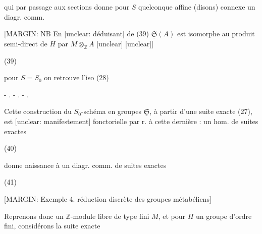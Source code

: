 qui par passage aux sections donne
pour $S$ quelconque affine (disons) connexe
un diagr. comm.

[MARGIN: NB En [unclear: déduisant] de (39)
$\underline{\mathfrak{S}}(A)$ est isomorphe
au produit semi-direct
de $H$ par
$M \otimes_{\mathbb{Z}} A$
[unclear]
[unclear]]

(39)

pour $S=S_0$ on retrouve l'iso (28)

- . - . - .

Cette construction du $S_0$-schéma en
groupes $\underline{\mathfrak{S}}$, à partir d'une
suite exacte (27), est [unclear: manifestement]
fonctorielle par r. à cette dernière : un
hom. de suites exactes

(40)

donne naissance à un diagr. comm.
de suites exactes

\newpage


(41)

[MARGIN: Exemple 4. réduction discrète des groupes métabéliens]

Reprenons donc un $\mathbb{Z}$-module libre
de type fini $M$, et pour $H$ un
groupe d'ordre fini, considérons
la suite exacte

